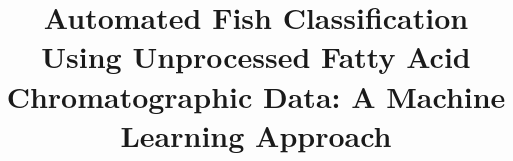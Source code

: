 \documentclass[runningheads]{llncs}
\begin{document}
%
\title{Automated Fish Classification Using Unprocessed Fatty Acid Chromatographic Data: A Machine Learning Approach}
%
%
%
\end{document}
